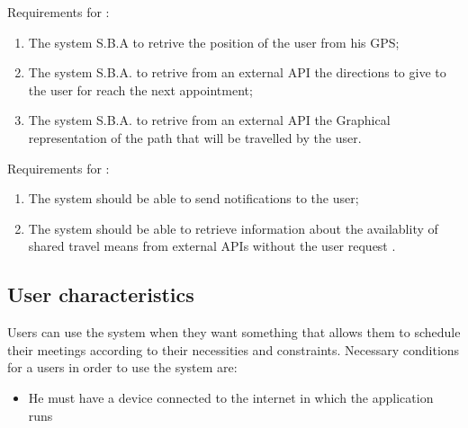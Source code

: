 Requirements for :
\begin{enumerate}[resume]
\renewcommand\labelenumi{\textbf{R\theenumi}}
\item The system S.B.A to retrive the position of the user from his GPS; \label{req:R20}
\item The system S.B.A. to retrive from an external API the directions to give to the user for reach the next appointment; \label{req:R21}
\item The system S.B.A. to retrive from an external API the Graphical representation of the path that will be travelled by the user. \label{req:R22}
\end{enumerate}


Requirements for :
\begin{enumerate}[resume]
\renewcommand\labelenumi{\textbf{R\theenumi}}
\item The system should be able to send notifications to the user; \label{req:R23}
\item The system should be able to retrieve information about the availablity of shared travel means from external APIs without the user request \label{req:R24}.
\end{enumerate}


\subsection{User characteristics}
Users can use the system when they want something that allows them to schedule their meetings according to their necessities and constraints. Necessary conditions for a users in order to use the system are: 

\begin{itemize}
\item He must have a device connected to the internet in which the application runs
\end{itemize}

